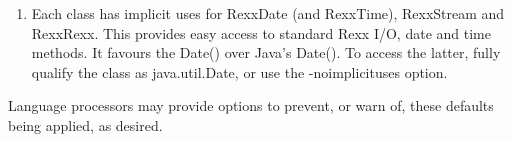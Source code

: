 \begin{enumerate}
\item Each class has implicit uses for RexxDate (and RexxTime), RexxStream and RexxRexx. 
This provides easy access to standard Rexx I/O, date and time methods. It favours the \nr{} Date() over Java's Date(). 
To access the latter, fully qualify the class as java.util.Date, or use the -noimplicituses option.
\end{enumerate}
 
Language processors may provide options to prevent, or warn of, these
defaults being applied, as desired.
